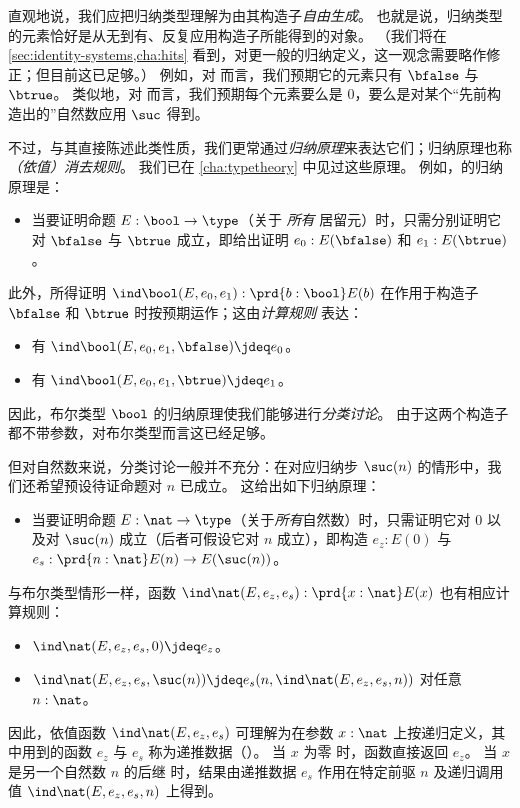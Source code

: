 %
直观地说，我们应把归纳类型理解为由其构造子\emph{自由生成}。
也就是说，归纳类型的元素恰好是从无到有、反复应用构造子所能得到的对象。
（我们将在 \cref{sec:identity-systems,cha:hits} 看到，对更一般的归纳定义，这一观念需要略作修正；但目前这已足够。）
例如，对 \bool 而言，我们预期它的元素只有 $\bfalse$ 与 $\btrue$。
类似地，对 \nat 而言，我们预期每个元素要么是 $0$，要么是对某个“先前构造出的”自然数应用 $\suc$ 得到。

%
不过，与其直接陈述此类性质，我们更常通过\emph{归纳原理}来表达它们；归纳原理也称\emph{（依值）消去规则}。
我们已在 \cref{cha:typetheory} 中见过这些原理。
例如，\bool 的归纳原理是：
%
\begin{itemize}
\item 当要证明命题 $E : \bool \to \type$（关于 \emph{所有} \bool 居留元）时，只需分别证明它对 $\bfalse$ 与 $\btrue$ 成立，即给出证明 $e_0 : E(\bfalse)$ 和 $e_1 : E(\btrue)$。
\end{itemize}

此外，所得证明 $\ind\bool(E,e_0,e_1): \prd{b : \bool}E(b)$ 在作用于构造子 $\bfalse$ 和 $\btrue$ 时按预期运作；这由\emph{计算规则} 表达：
\begin{itemize}
\item 有 $\ind\bool(E,e_0,e_1,\bfalse) \jdeq e_0$。
\item 有 $\ind\bool(E,e_0,e_1,\btrue) \jdeq e_1$。
\end{itemize}

%
因此，布尔类型 $\bool$ 的归纳原理使我们能够进行\emph{分类讨论}。
由于这两个构造子都不带参数，对布尔类型而言这已经足够。

%
但对自然数来说，分类讨论一般并不充分：在对应归纳步 $\suc(n)$ 的情形中，我们还希望预设待证命题对 $n$ 已成立。
这给出如下归纳原理：
\begin{itemize}
\item 当要证明命题 $E : \nat \to \type$（关于\emph{所有}自然数）时，只需证明它对 $0$ 以及对 $\suc(n)$ 成立（后者可假设它对 $n$ 成立），即构造
$e_z : E(0)$ 与 $e_s : \prd{n : \nat} E(n) \to E(\suc(n))$。
\end{itemize}
与布尔类型情形一样，函数 $\ind\nat(E,e_z,e_s) : \prd{x:\nat} E(x)$ 也有相应计算规则：
%
\begin{itemize}
\item $\ind\nat(E,e_z,e_s,0) \jdeq e_z$。
\item $\ind\nat(E,e_z,e_s,\suc(n)) \jdeq e_s(n,\ind\nat(E,e_z,e_s,n))$ 对任意 $n : \nat$。
\end{itemize}
因此，依值函数 $\ind\nat(E,e_z,e_s)$ 可理解为在参数 $x : \nat$ 上按递归定义，其中用到的函数 $e_z$ 与 $e_s$ 称为递推数据（）。
当 $x$ 为零 时，函数直接返回 $e_z$。
当 $x$ 是另一个自然数 $n$ 的后继 时，结果由递推数据 $e_s$ 作用在特定前驱 $n$ 及递归调用值 $\ind\nat(E,e_z,e_s,n)$ 上得到。

